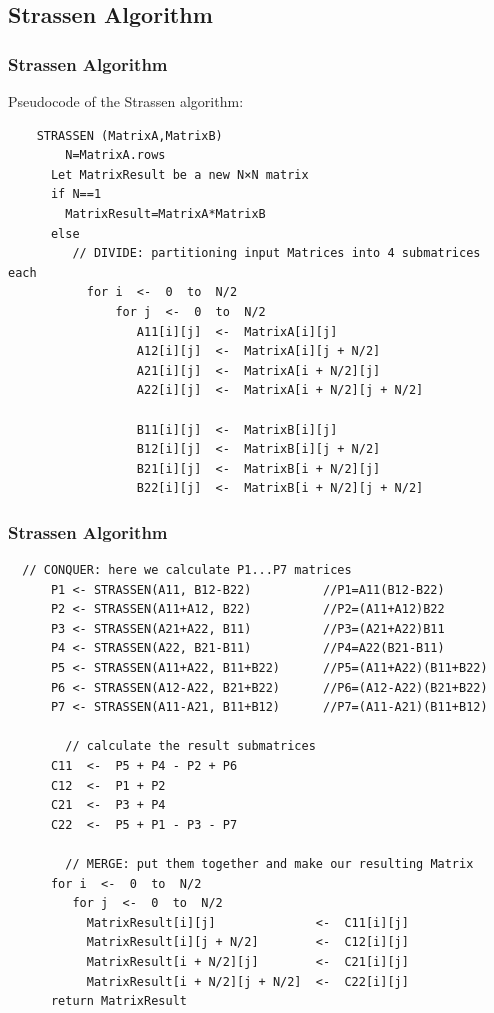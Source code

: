 \documentclass[cjk]{beamer}
\begin{document}
\subsection{Strassen Algorithm}
\begin{frame}[fragile]
  \frametitle{\textbf{Strassen Algorithm}}
  Pseudocode of the Strassen algorithm:
  \begin{lstlisting}
    STRASSEN (MatrixA,MatrixB)
        N=MatrixA.rows
      Let MatrixResult be a new N×N matrix
      if N==1
        MatrixResult=MatrixA*MatrixB
      else
         // DIVIDE: partitioning input Matrices into 4 submatrices each
           for i  <-  0  to  N/2
               for j  <-  0  to  N/2
                  A11[i][j]  <-  MatrixA[i][j]
                  A12[i][j]  <-  MatrixA[i][j + N/2]
                  A21[i][j]  <-  MatrixA[i + N/2][j]
                  A22[i][j]  <-  MatrixA[i + N/2][j + N/2]

                  B11[i][j]  <-  MatrixB[i][j]
                  B12[i][j]  <-  MatrixB[i][j + N/2]
                  B21[i][j]  <-  MatrixB[i + N/2][j]
                  B22[i][j]  <-  MatrixB[i + N/2][j + N/2]
  \end{lstlisting}
\end{frame}
\begin{frame}[fragile]
  \frametitle{Strassen Algorithm}
  \begin{lstlisting}
  // CONQUER: here we calculate P1...P7 matrices
      P1 <- STRASSEN(A11, B12-B22)          //P1=A11(B12-B22)
      P2 <- STRASSEN(A11+A12, B22)          //P2=(A11+A12)B22
      P3 <- STRASSEN(A21+A22, B11)          //P3=(A21+A22)B11
      P4 <- STRASSEN(A22, B21-B11)          //P4=A22(B21-B11)
      P5 <- STRASSEN(A11+A22, B11+B22)      //P5=(A11+A22)(B11+B22)
      P6 <- STRASSEN(A12-A22, B21+B22)      //P6=(A12-A22)(B21+B22)
      P7 <- STRASSEN(A11-A21, B11+B12)      //P7=(A11-A21)(B11+B12)

        // calculate the result submatrices
      C11  <-  P5 + P4 - P2 + P6
      C12  <-  P1 + P2
      C21  <-  P3 + P4
      C22  <-  P5 + P1 - P3 - P7

        // MERGE: put them together and make our resulting Matrix
      for i  <-  0  to  N/2
         for j  <-  0  to  N/2
           MatrixResult[i][j]              <-  C11[i][j]
           MatrixResult[i][j + N/2]        <-  C12[i][j]
           MatrixResult[i + N/2][j]        <-  C21[i][j]
           MatrixResult[i + N/2][j + N/2]  <-  C22[i][j]
      return MatrixResult
\end{lstlisting}
\end{frame}
\end{document}
